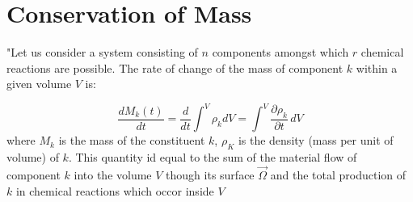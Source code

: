 \section{Conservation of Mass}

"Let us consider a system consisting of $n$ components amongst which $r$ chemical reactions are possible. 
The rate of change of the mass of component $k$ within a given volume $V$ is:

\begin{equation}
\frac{d M_k(t)}{dt} = \frac{d}{dt}\int^V \rho_k dV = \int^V \frac{\partial \rho_k}{\partial t}\, dV
\label{dGM1}
\end{equation}
where $M_k$ is the mass of the constituent $k$, $\rho_K$ is the density (mass per unit of volume) of $k$. This quantity id equal to the sum of the material flow of component $k$ into the volume $V$ though its surface $\vec{\Omega}$ and the total production of $k$ in chemical reactions which occor inside $V$

